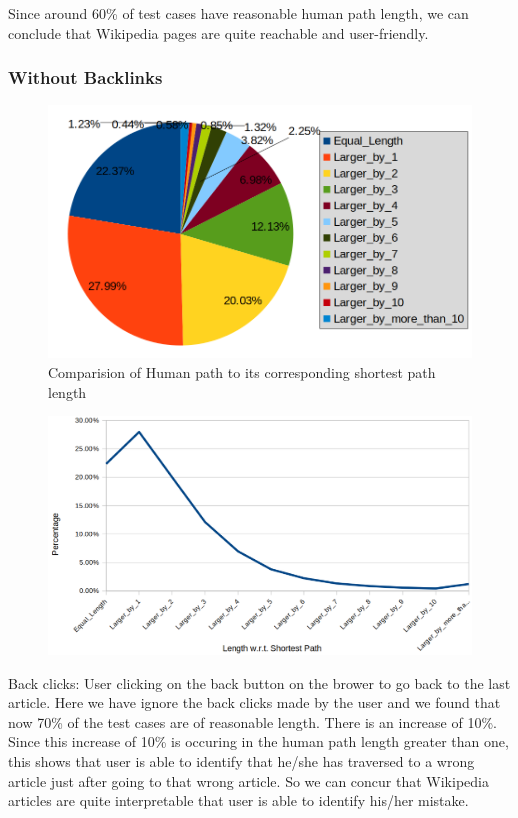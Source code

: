 \documentclass[12pt]{article}
\begin{document}
Since around 60\% of test cases have reasonable human path length, we can conclude that Wikipedia pages are quite reachable and user-friendly. 

\subsubsection{Without Backlinks}
\begin{figure}[h]
    \centering
    \hspace{-60pt}
    \includegraphics[scale = 0.4]{images/percentage_pi_noback.png}
    \caption{Comparision of Human path to its corresponding shortest path length}
\end{figure}

\begin{figure}[h]
    \centering
    \includegraphics[scale = 0.28]{images/percentage_noback_line.png}
    \caption{}
\end{figure}
Back clicks: User clicking on the back button on the brower to go back to the last article.
Here we have ignore the back clicks made by the user and we found that now 70\% of the test cases are of reasonable length. There is an increase of 10\%. Since this increase of 10\% is occuring in the human path length greater than one, this shows that user is able to identify that he/she has traversed to a wrong article just after going to that wrong article. So we can concur that Wikipedia articles are quite interpretable that user is able to identify his/her mistake.
\end{document}
